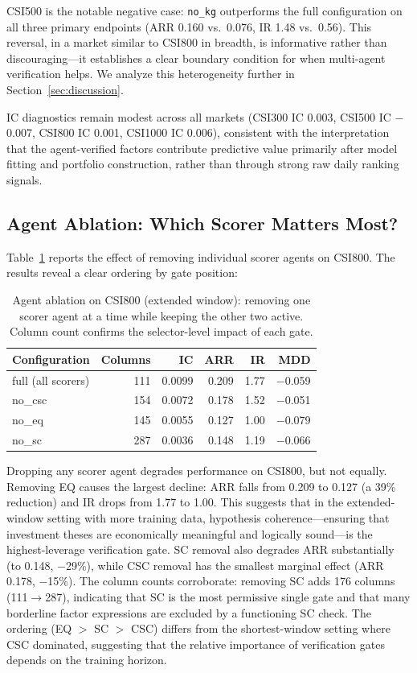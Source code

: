 \documentclass[sigconf]{acmart}
\begin{document}
CSI500 is the notable negative case: \texttt{no\_kg} outperforms the full configuration on all three primary endpoints (ARR 0.160 vs.\ 0.076, IR 1.48 vs.\ 0.56). This reversal, in a market similar to CSI800 in breadth, is informative rather than discouraging---it establishes a clear boundary condition for when multi-agent verification helps. We analyze this heterogeneity further in Section~\ref{sec:discussion}.

IC diagnostics remain modest across all markets (CSI300 IC 0.003, CSI500 IC $-$0.007, CSI800 IC 0.001, CSI1000 IC 0.006), consistent with the interpretation that the agent-verified factors contribute predictive value primarily after model fitting and portfolio construction, rather than through strong raw daily ranking signals.

\subsection{Agent Ablation: Which Scorer Matters Most?}

Table~\ref{tab:ablation} reports the effect of removing individual scorer agents on CSI800. The results reveal a clear ordering by gate position:

\begin{table}[t]
\caption{Agent ablation on CSI800 (extended window): removing one scorer agent at a time while keeping the other two active. Column count confirms the selector-level impact of each gate.}
\label{tab:ablation}
\centering
\begin{tabular}{l r r r r r}
\toprule
Configuration & Columns & IC & ARR & IR & MDD \\
\midrule
full (all scorers)  & 111 & 0.0099 & 0.209 & 1.77 & $-$0.059 \\
no\_csc & 154 & 0.0072 & 0.178 & 1.52 & $-$0.051 \\
no\_eq  & 145 & 0.0055 & 0.127 & 1.00 & $-$0.079 \\
no\_sc  & 287 & 0.0036 & 0.148 & 1.19 & $-$0.066 \\
\bottomrule
\end{tabular}
\end{table}

Dropping any scorer agent degrades performance on CSI800, but not equally. Removing EQ causes the largest decline: ARR falls from 0.209 to 0.127 (a 39\% reduction) and IR drops from 1.77 to 1.00. This suggests that in the extended-window setting with more training data, hypothesis coherence---ensuring that investment theses are economically meaningful and logically sound---is the highest-leverage verification gate. SC removal also degrades ARR substantially (to 0.148, $-$29\%), while CSC removal has the smallest marginal effect (ARR 0.178, $-$15\%). The column counts corroborate: removing SC adds 176 columns (111$\rightarrow$287), indicating that SC is the most permissive single gate and that many borderline factor expressions are excluded by a functioning SC check. The ordering (EQ $>$ SC $>$ CSC) differs from the shortest-window setting where CSC dominated, suggesting that the relative importance of verification gates depends on the training horizon.
\end{document}
